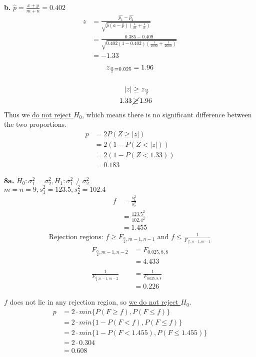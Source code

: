 \documentclass[12pt]{report}
\begin{document}
\noindent \textbf{b.} $\hat{p} = \frac{x+y}{m+n} = 0.402$
\begin{align*}
	z &= \frac{\hat{p_1}-\hat{p_2}}{\sqrt{\hat{p}(a-\hat{p})\left(\frac{1}{m} + \frac{1}{n}\right)}}\\
	&= \frac{0.385 - 0.409}{\sqrt{0.402(1-0.402)\left(\frac{1}{1090} + \frac{1}{2600}\right)}}\\
	&= \boxed{-1.33}
\end{align*}
\begin{align*}
	z_{\frac{\alpha}{2} = 0.025} &= 1.96\\\\
	|z| &\geq z_{\frac{\alpha}{2}}\\
	1.33 &\,\cancel{\geq}\, 1.96
\end{align*}
\noindent Thus we \underline{do not reject $H_0$}, which means there is no significant difference between the two proportions.
\begin{align*}
	p &= 2P(Z \geq |z|)\\
	&= 2(1 - P(Z < |z|))\\
	&= 2(1 - P(Z < 1.33))\\
	&= \boxed{0.183}
\end{align*}

\noindent \textbf{8a.} $H_0 : \sigma^2_1 = \sigma^2_2, H_1 : \sigma^2_1 \neq \sigma^2_2$\\
$m=n=9, s^2_1 = 123.5, s_2^2 = 102.4$
\begin{align*}
	f &= \frac{s_1^2}{s_2^2}\\
	&= \frac{123.5^2}{102.4^2}\\
	&= 1.455
\end{align*}
\begin{align*}
	\text{Rejection regions: } f \geq F_{\frac{\alpha}{2},m-1,n-1}\text{ and } f \leq \frac{1}{F_{\frac{\alpha}{2},n-1,m-1}}
\end{align*}
\begin{align*}
	F_{\frac{\alpha}{2}, m-1, n-2} &= F_{0.025,8,8}\\
	&= 4.433\\\\
	\frac{1}{F_{\frac{\alpha}{2}, n-1, m-2}} &= \frac{1}{F_{0.025,8,8}}\\
	&= 0.226
\end{align*}

\noindent $f$ does not lie in any rejection region, so \underline{we do not reject $H_0$}.
\begin{align*}
	p &= 2 \cdot min\{P(F \geq f), P(F \leq f)\}\\
	&= 2 \cdot min\{1 - P(F < f), P(F \leq f)\}\\
	&= 2 \cdot min\{1 - P(F < 1.455), P(F \leq 1.455)\}\\
	&= 2 \cdot 0.304\\
	&= \boxed{0.608}
\end{align*}
\end{document}
